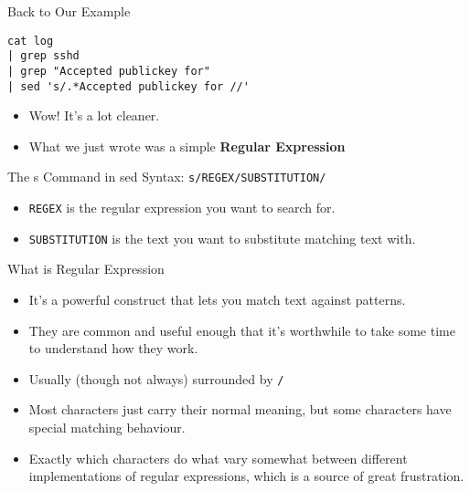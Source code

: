 \documentclass[12pt]{beamer}
\begin{document}
\begin{frame}[fragile]{Back to Our Example}
  \begin{verbatim}
cat log
| grep sshd
| grep "Accepted publickey for"
| sed 's/.*Accepted publickey for //'
  \end{verbatim}
  \begin{itemize}
    \item Wow! It's a lot cleaner.
    \item What we just wrote was a simple \textbf{Regular Expression}
  \end{itemize}
\end{frame}

\begin{frame}{The s Command in sed}
  Syntax: \texttt{s/REGEX/SUBSTITUTION/}
  \begin{itemize}
    \item \texttt{REGEX} is the regular expression you want to search for.
    \item \texttt{SUBSTITUTION} is the text you want to substitute matching text with.
  \end{itemize}
\end{frame}

\begin{frame}{What is Regular Expression}
  \begin{itemize}
    \item It's a powerful construct that lets you match text against patterns.
    \item They are common and useful enough that it’s worthwhile to take some time to understand how they work.
    \item Usually (though not always) surrounded by \texttt{/}
    \item Most characters just carry their normal meaning, but some characters have special matching behaviour.
    \item Exactly which characters do what vary somewhat between different implementations of regular expressions, which is a source of great frustration.
  \end{itemize}
\end{frame}
\end{document}
